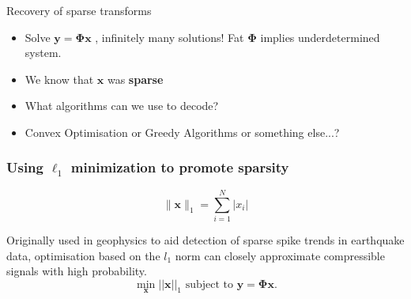 \documentclass[xcolor=dvipsnames,10pt]{beamer}
\begin{document}
      \begin{frame}{Recovery of sparse transforms}
        \begin{itemize}
\item Solve $\boldsymbol{y} = \boldsymbol{\Phi x}$ , infinitely many solutions! Fat $\boldsymbol{\Phi}$ implies underdetermined system. 
\item We know that $\boldsymbol{x}$ was \textbf{sparse} 
\item What algorithms can we use to decode? 
\item Convex Optimisation or Greedy Algorithms or something else...?
        \end{itemize}
\end{frame}

\begin{frame}
  \frametitle{Using $\ell_1$ minimization to promote sparsity}

\begin{equation*}
\label{eq:57}
  \|\boldsymbol{x}\|_1 = \sum_{i=1}^{N}|x_i|
\end{equation*}

Originally used in geophysics to aid detection of sparse spike trends in earthquake data, optimisation based on the $l_1$ norm can closely approximate compressible signals with high probability.  
\begin{equation*}
  \label{eq:4}
  \min_{\boldsymbol{x}} ||\boldsymbol{x}||_1 \text{ subject to } \boldsymbol{y} = \boldsymbol{\Phi} \boldsymbol{x}.
\end{equation*}


\end{frame}
\end{document}
